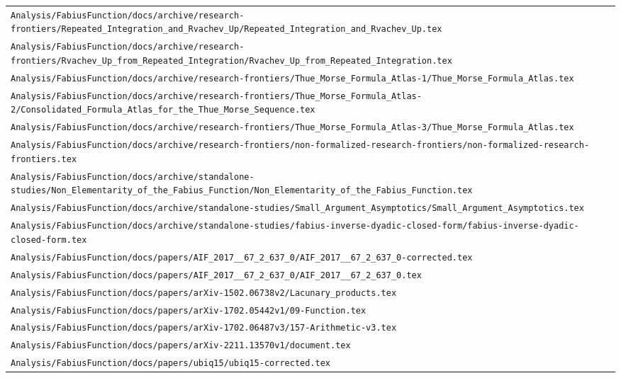 \begin{longtable}{@{}p{\textwidth}@{}}
\nolinkurl{Analysis/FabiusFunction/docs/archive/research-frontiers/Repeated_Integration_and_Rvachev_Up/Repeated_Integration_and_Rvachev_Up.tex}\\[0.12em]
\nolinkurl{Analysis/FabiusFunction/docs/archive/research-frontiers/Rvachev_Up_from_Repeated_Integration/Rvachev_Up_from_Repeated_Integration.tex}\\[0.12em]
\nolinkurl{Analysis/FabiusFunction/docs/archive/research-frontiers/Thue_Morse_Formula_Atlas-1/Thue_Morse_Formula_Atlas.tex}\\[0.12em]
\nolinkurl{Analysis/FabiusFunction/docs/archive/research-frontiers/Thue_Morse_Formula_Atlas-2/Consolidated_Formula_Atlas_for_the_Thue_Morse_Sequence.tex}\\[0.12em]
\nolinkurl{Analysis/FabiusFunction/docs/archive/research-frontiers/Thue_Morse_Formula_Atlas-3/Thue_Morse_Formula_Atlas.tex}\\[0.12em]
\nolinkurl{Analysis/FabiusFunction/docs/archive/research-frontiers/non-formalized-research-frontiers/non-formalized-research-frontiers.tex}\\[0.12em]
\nolinkurl{Analysis/FabiusFunction/docs/archive/standalone-studies/Non_Elementarity_of_the_Fabius_Function/Non_Elementarity_of_the_Fabius_Function.tex}\\[0.12em]
\nolinkurl{Analysis/FabiusFunction/docs/archive/standalone-studies/Small_Argument_Asymptotics/Small_Argument_Asymptotics.tex}\\[0.12em]
\nolinkurl{Analysis/FabiusFunction/docs/archive/standalone-studies/fabius-inverse-dyadic-closed-form/fabius-inverse-dyadic-closed-form.tex}\\[0.12em]
\nolinkurl{Analysis/FabiusFunction/docs/papers/AIF_2017__67_2_637_0/AIF_2017__67_2_637_0-corrected.tex}\\[0.12em]
\nolinkurl{Analysis/FabiusFunction/docs/papers/AIF_2017__67_2_637_0/AIF_2017__67_2_637_0.tex}\\[0.12em]
\nolinkurl{Analysis/FabiusFunction/docs/papers/arXiv-1502.06738v2/Lacunary_products.tex}\\[0.12em]
\nolinkurl{Analysis/FabiusFunction/docs/papers/arXiv-1702.05442v1/09-Function.tex}\\[0.12em]
\nolinkurl{Analysis/FabiusFunction/docs/papers/arXiv-1702.06487v3/157-Arithmetic-v3.tex}\\[0.12em]
\nolinkurl{Analysis/FabiusFunction/docs/papers/arXiv-2211.13570v1/document.tex}\\[0.12em]
\nolinkurl{Analysis/FabiusFunction/docs/papers/ubiq15/ubiq15-corrected.tex}\\[0.12em]
\end{longtable}
\endgroup

